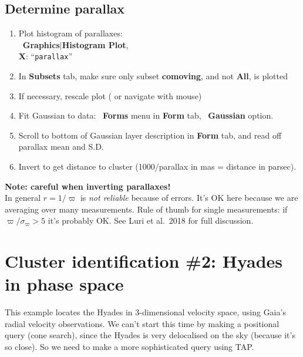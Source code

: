 \documentclass{article}
\newcommand{\buttimg}[1]
           {\mbox{\vtop{\vskip-2ex\hbox{\texttt{[image: \#1]}}}}}
\newcommand{\winfig}[2]
           {\vspace*{-0.5cm}
            \hspace*{0.5cm}\mbox{\vtop{\hbox{\texttt{[image: \#2]}}}}}
\newcommand{\lab}[1]{{\bf #1}}
\newcommand{\ma}[2]{\buttimg{#1}~\lab{#2}}
\newcommand{\mb}[3]{\buttimg{#1}~\lab{#2}$\mid$\lab{#3}}
\newcommand{\entry}[2]{\lab{#1}: ``{\tt #2}''}
\begin{document}
\subsection{Determine parallax}
\label{sec:histo-mean}

\begin{minipage}[t]{11cm}
  \raggedright
  \begin{enumerate}
  \item Plot histogram of parallaxes: \\
        \mb{histo_button.png}{Graphics}{Histogram Plot}, \\
        \entry{X}{parallax}
  \item In \lab{Subsets} tab, make sure only subset \lab{comoving},
        and not \lab{All}, is plotted
  \item If necessary, rescale plot
        (\buttimg{rescale_button.png} or navigate with mouse)
  \item Fit Gaussian to data:
        \ma{Plus1.png}{Forms} menu in \lab{Form} tab,
        \ma{ADD_FORM_GAUSSIAN}{Gaussian} option.
  \item Scroll to bottom of Gaussian layer description in \lab{Form} tab,
        and read off parallax mean and S.D.
  \item Invert to get distance to cluster
        (1000/parallax in mas = distance in parsec).
  \end{enumerate}

  {\bf Note: careful when inverting parallaxes!}\\
  In general $r = 1/\varpi$ is {\em not reliable\/}
  because of errors.
  It's OK here because we are averaging over many measurements.
  Rule of thumb for single measurements:
  if $\varpi/\sigma_\varpi>5$ it's probably OK.
  See Luri et al.\ 2018 \cite{luri} for full discussion.
\end{minipage}
\begin{minipage}[t]{8cm}
  \winfig{width=8cm}{m4-parallax.png}
\end{minipage}

\newpage

\section{Cluster identification \#2: Hyades in phase space}

This example locates the Hyades in 3-dimensional velocity space,
using Gaia's radial velocity observations.
We can't start this time by making a positional query (cone search),
since the Hyades is very delocalised on the sky (because it's so close).
So we need to make a more sophisticated query using TAP.
\end{document}
